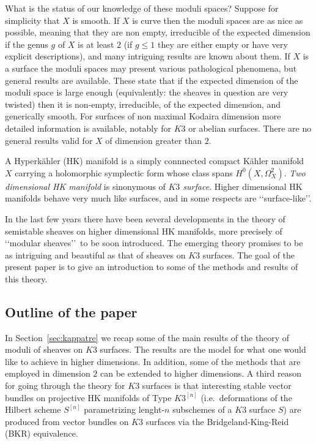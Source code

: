 \documentclass[11pt]{amsart}
\theoremstyle{definition}
\theoremstyle{remark}
\begin{document}
What is the status of our knowledge of these moduli spaces? Suppose for simplicity that $X$ is smooth. If $X$ is curve then the moduli spaces are as nice as possible, meaning that they are non empty, irreducible of the expected dimension if the genus $g$ of $X$ is at least $2$ (if $g\le 1$ they are either empty or have very explicit descriptions), and many intriguing results are known about them.
If $X$ is a surface the moduli spaces may present various pathological phenomena, but
 general results are available. These state that if the expected dimension of the moduli space is large enough (equivalently: the sheaves in question are very twisted) then it is non-empty, irreducible, of the expected dimension, and generically smooth. For surfaces of non maximal Kodaira dimension more detailed information is available, notably for $K3$ or abelian surfaces.  There are no general results valid for $X$ of dimension greater than $2$. 

A Hyperk\"ahler (HK) manifold is a  simply connnected compact K\"ahler manifold $X$ carrying a holomorphic symplectic form whose class spans  
$H^0(X,\Omega^2_X)$. \emph{Two dimensional HK manifold} is sinonymous of \emph{$K3$ surface}. Higher dimensional HK manifolds behave very much like surfaces, and in some respects are \lq\lq surface-like\rq\rq.  


In the last few years there have been several developments in the theory of semistable sheaves on higher dimensional HK manifolds, more precisely of \lq\lq modular sheaves\rq\rq\, to be soon introduced. The emerging theory    promises to be as intriguing and beautiful as that of sheaves on $K3$ surfaces. The goal of the present paper is to give an introduction to some of the methods and results of this theory.
%
\subsection{Outline of the paper}
%
%
\setcounter{equation}{0}
%
In Section~\ref{sec:kappatre} we recap some of the main results of the theory of moduli of sheaves on $K3$ surfaces. 
The results are the model for what one would like to achieve in higher dimensions. In addition, some of the methods that are employed in dimension $2$ can be extended to higher dimensions.
A third reason for going through the theory for $K3$ surfaces is that interesting stable vector bundles  on projective HK manifolds of Type $K3^{[n]}$ (i.e.~deformations of the Hilbert scheme $S^{[n]}$ parametrizing lenght-$n$ subschemes of a $K3$ surface $S$) are produced from vector bundles on $K3$ surfaces  via the Bridgeland-King-Reid (BKR) equivalence. 
\end{document}
